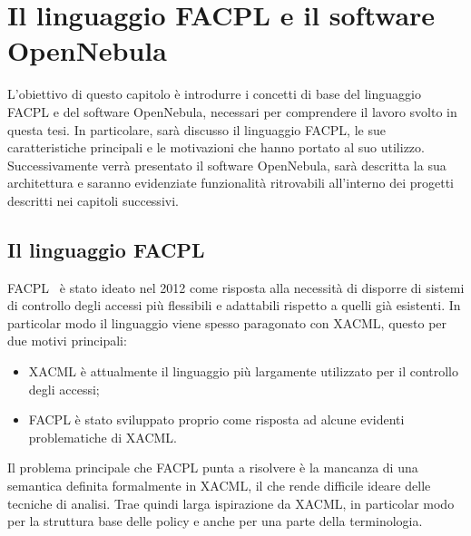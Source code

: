 \chapter{Il linguaggio FACPL e il software OpenNebula}
\label{cap:capitolo2}
L'obiettivo di questo capitolo è introdurre i concetti di base del linguaggio FACPL e del software OpenNebula, necessari per comprendere il lavoro svolto in questa tesi. In particolare, sarà discusso il linguaggio FACPL, le sue caratteristiche principali e le motivazioni che hanno portato al suo utilizzo. Successivamente verrà presentato il software OpenNebula, sarà descritta la sua architettura e saranno evidenziate funzionalità ritrovabili all'interno dei progetti descritti nei capitoli successivi.\par
\section{Il linguaggio FACPL}
FACPL~\cite{FAPCLTesi} è stato ideato nel 2012 come risposta alla necessità di disporre di sistemi di controllo degli accessi più flessibili e adattabili rispetto a quelli già esistenti. In particolar modo il linguaggio viene spesso paragonato con XACML, questo per due motivi principali: 
\begin{itemize}
    \item XACML è attualmente il linguaggio più largamente utilizzato per il controllo degli accessi;
    \item FACPL è stato sviluppato proprio come risposta ad alcune evidenti problematiche di XACML.
\end{itemize}
Il problema principale che FACPL punta a risolvere è la mancanza di una semantica definita formalmente in XACML, il che rende difficile ideare delle tecniche di analisi. Trae quindi larga ispirazione da XACML, in particolar modo per la struttura base delle policy e anche per una parte della terminologia.\par

